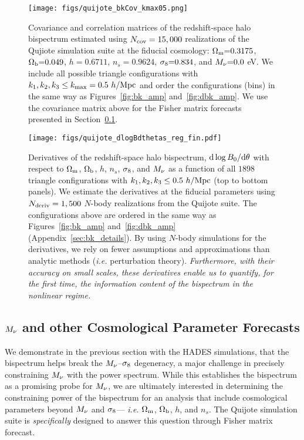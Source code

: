 \begin{figure}
\begin{center}
    \texttt{[image: figs/quijote\_bkCov\_kmax05.png]} 
    \caption{Covariance and correlation matrices of the redshift-space halo bispectrum 
    estimated using $N_{\rm cov} = 15,000$ realizations of the Qujiote simulation suite at 
    the fiducial cosmology: $\Omega_{\rm m}{=}0.3175$, $\Omega_{\rm b}{=}0.049$, $h{=}0.6711$, $n_s{=}0.9624$, $\sigma_8{=}0.834$, 
    and $M_\nu{=}0.0$ eV. We include all possible triangle configurations with 
    $k_1, k_2, k_3 \leq k_{\rm max} = 0.5~h/{\rm Mpc}$ and order the configurations 
    (bins) in the same way as Figures~\ref{fig:bk_amp} and~\ref{fig:dbk_amp}. We 
    use the covariance matrix above for the Fisher matrix forecasts presented in 
    Section~\ref{sec:forecasts}. 
    }
\label{fig:bk_cov}
\end{center}
\end{figure}

\begin{figure}
\begin{center}
    \texttt{[image: figs/quijote\_dlogBdthetas\_reg\_fin.pdf]} 
    \caption{Derivatives of the redshift-space halo bispectrum, ${\rm d}\log B_0 / {\rm d} \theta$ 
    with respect to $\Omega_{\rm m}$, $\Omega_{\rm b}$, $h$, $n_s$, $\sigma_8$, and $M_\nu$ as a function 
    of all $1898$ triangle configurations with $k_1, k_2, k_3 \leq 0.5~h/{\rm Mpc}$ 
    (top to bottom panels). We estimate the derivatives at the fiducial parameters 
    using $N_{\rm deriv} = 1,500$ $N$-body realizations from the Quijote suite. 
    The configurations above are ordered in the same way as Figures~\ref{fig:bk_amp} 
    and~\ref{fig:dbk_amp} (Appendix~\ref{sec:bk_details}). By using $N$-body 
    simulations for the derivatives, we rely on fewer assumptions and approximations
    than analytic methods (\emph{i.e.} perturbation theory). \emph{Furthermore, with 
    their accuracy on small scales, these derivatives enable us to quantify, for the 
    first time, the information content of the bispectrum in the nonlinear regime.}
    }
\label{fig:bk_deriv}
\end{center}
\end{figure}

\subsection{$M_\nu$ and other Cosmological Parameter Forecasts} \label{sec:forecasts}
We demonstrate in the previous section with the HADES simulations, that 
the bispectrum helps break the $M_\nu$--$\sigma_8$ degeneracy, a major 
challenge in precisely constraining $M_\nu$ with the power spectrum. 
While this establishes the bispectrum as a promising probe for $M_\nu$, 
we are ultimately interested in determining the constraining power of the 
bispectrum for an analysis that include cosmological parameters beyond 
$M_\nu$ and $\sigma_8$--- \emph{i.e.} $\Omega_{\rm m}$, $\Omega_{\rm b}$, $h$, and $n_s$. The Quijote 
simulation suite is \emph{specifically} designed to answer this question
through Fisher matrix forecast.


